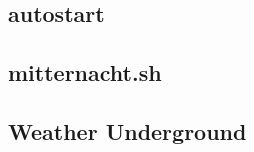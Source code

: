 \subsection{autostart}
\label{subsec:autostart}

\subsection{mitternacht.sh}
\label{subsec:mitternacht.sh}

\subsection{Weather Underground}
\label{subsec:wunderground}

